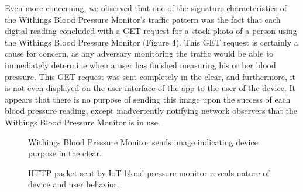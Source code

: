 Even more concerning, we observed that one of the signature characteristics of
the Withings Blood Pressure Monitor's traffic pattern was the fact that each
digital reading concluded with a GET request for a stock photo of a person
using the Withings Blood Pressure Monitor (Figure 4). This GET request is
certainly a cause for concern, as any adversary monitoring the traffic would
be able to immediately determine when a user has finished measuring his or her
blood pressure. This GET request was sent completely in the clear, and
furthermore, it is not even displayed on the user interface of the app to the
user of the device. It appears that there is no purpose of sending this image
upon the success of each blood pressure reading, except inadvertently
notifying network observers that the Withings Blood Pressure Monitor is in
use.

\begin{figure}[t]
  \centering
     \caption{Withings Blood Pressure Monitor sends image indicating device purpose in the clear.}
     \label{fig:bp-image}
\end{figure}

\begin{figure}[t]
  \centering
  \caption{HTTP packet sent by IoT blood pressure monitor reveals nature of device and user behavior.}
  \label{fig:bp-packet}
\end{figure}

